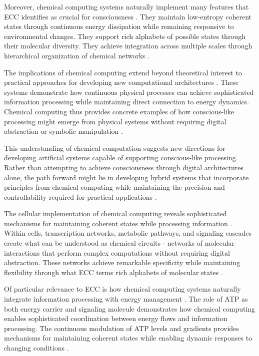 Moreover, chemical computing systems naturally implement many features that ECC identifies as crucial for consciousness \cite{Magnasco1997}. They maintain low-entropy coherent states through continuous energy dissipation while remaining responsive to environmental changes. They support rich alphabets of possible states through their molecular diversity. They achieve integration across multiple scales through hierarchical organization of chemical networks \cite{Prakash2007}.

The implications of chemical computing extend beyond theoretical interest to practical approaches for developing new computational architectures \cite{Qian2011}. These systems demonstrate how continuous physical processes can achieve sophisticated information processing while maintaining direct connection to energy dynamics. Chemical computing thus provides concrete examples of how conscious-like processing might emerge from physical systems without requiring digital abstraction or symbolic manipulation \cite{Soloveichik2010}.

This understanding of chemical computation suggests new directions for developing artificial systems capable of supporting conscious-like processing. Rather than attempting to achieve consciousness through digital architectures alone, the path forward might lie in developing hybrid systems that incorporate principles from chemical computing while maintaining the precision and controllability required for practical applications \cite{Szacilowski2012, Wang2021}.

The cellular implementation of chemical computing reveals sophisticated mechanisms for maintaining coherent states while processing information \cite{Dittrich2018}. Within cells, transcription networks, metabolic pathways, and signaling cascades create what can be understood as chemical circuits - networks of molecular interactions that perform complex computations without requiring digital abstraction. These networks achieve remarkable specificity while maintaining flexibility through what ECC terms rich alphabets of molecular states \cite{Benenson2019}.

Of particular relevance to ECC is how chemical computing systems naturally integrate information processing with energy management \cite{Katz2012}. The role of ATP as both energy carrier and signaling molecule demonstrates how chemical computing enables sophisticated coordination between energy flows and information processing. The continuous modulation of ATP levels and gradients provides mechanisms for maintaining coherent states while enabling dynamic responses to changing conditions \cite{Lehn2013}.

